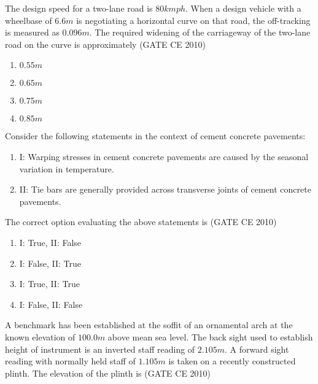     \item The design speed for a two-lane road is $80kmph$. When a design vehicle with a wheelbase of $6.6m$ is negotiating a horizontal curve on  
    that road, the off-tracking is measured as $0.096m$. The required widening of the carriageway of the two-lane road on the curve is approximately   \hfill (GATE CE 2010)

    \begin{multicols}{4}
        \begin{enumerate}
            \item $0.55 m$
            \item $0.65 m$
            \item $0.75 m$
            \item $0.85 m$
        \end{enumerate}
    \end{multicols}

    \item Consider the following statements in the context of cement concrete pavements:
    \begin{enumerate}
        \item[] I: Warping stresses in cement concrete pavements are caused by the seasonal variation in temperature.
        \item[] II: Tie bars are generally provided across transverse joints of cement concrete pavements.
    \end{enumerate}
    The correct option evaluating the above statements  
    is \hfill (GATE CE 2010)
    \begin{multicols}{2}
        \begin{enumerate}
            \item I: True, II: False
            \item I: False, II: True
            \item I: True, II: True
            \item I: False, II: False
        \end{enumerate}
    \end{multicols}


    \item A benchmark has been established at the soffit of an ornamental arch at the known elevation of $100.0 m$ above mean sea level. The back sight used to establish height of instrument is an inverted staff reading of $2.105 m$. A forward sight reading with normally held staff of $1.105 m$ is taken on a recently constructed plinth. The elevation of the plinth is \hfill (GATE CE 2010)

